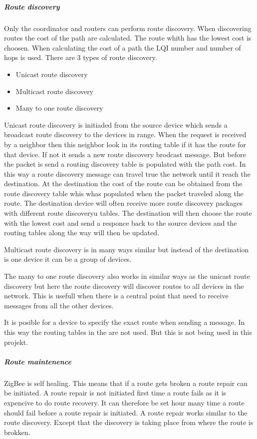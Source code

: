 \documentclass[a4paper,12pt,english]{article}
\begin{document}
\subparagraph{Route discovery}
Only the coordinator and routers can perform route discovery. When discovering
routes the cost of the path are calculated. The route whith has the lowest cost
is choosen. When calculating the cost of a path the LQI number and number of
hops is used. There are 3 types of route discovery.

\begin{itemize}
  \item Unicast route discovery
  \item Multicast route discovery
  \item Many to one route discovery
\end{itemize}

Unicast route discovery is initiaded from the source device which sends
a broadcast route discovery to the devices in range. When the request is
received by a neighbor then this neighbor look in its routing table if it has
the route for that device. If not it sends a new route discovery brodcast
message. But before the packet is send a routing discovery table is populated
with the path cost. In this way a route discovery message can travel true the
network until it reach the destination. At the destination the cost of the route
can be obtained from the route discovery table whis whas populated when the
packet traveled along the route. The destination device will often receive more
route discovery packages with different route discoveryu tables. The destination
will then choose the route with the lowest cost and send a responce back to the
source devices and the routing tables along the way will then be updated.

Multicast route discovery is in many ways similar but instead of the destination
is one device it can be a group of devices. 

The many to one route discovery also works in similar ways as the unicast route
discovery but here the route discovery will discover routes to all devices in
the network. This is usefull when there is a central point that need to
receive messages from all the other devices.

It is posible for a device to specify the exact route when sending a
message. In this way the routing tables in the are not used. But this is not
being used in this projekt.

\subparagraph{Route maintenence}
ZigBee is self healing. This means that if a route gets broken a route
repair can be initiated. A route repair is not initiated first time a route
fails as it is expencive to do route recovery. It can therefore be set hour
many time a route should fail before a route repair is initiated. A route repair
works similar to the route discovery. Except that the discovery is taking place
from where the route is brokken.
\end{document}
